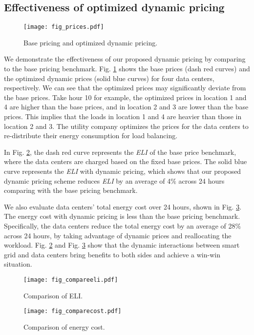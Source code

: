 \documentclass[journal]{IEEEtran}
\begin{document}
	\subsection{Effectiveness of optimized dynamic pricing}
	\begin{figure}[tbhp]
		\vspace{-2mm}
		\centering
		\texttt{[image: fig\_prices.pdf]}
		\caption{\label{fig_prices}Base pricing and optimized dynamic pricing.}
		\vspace{-2mm}
	\end{figure}
	We demonstrate the effectiveness of our proposed dynamic pricing by comparing to the base pricing benchmark. Fig. \ref{fig_prices} shows the base prices (dash red curves) and the optimized dynamic prices (solid blue curves) for four data centers, respectively. We can see that the optimized prices may significantly deviate from the base prices. Take hour 10 for example, the optimized prices in location 1 and 4 are higher than the base prices, and in location 2 and 3 are lower than the base prices. This implies that the loads in location 1 and 4 are heavier than those in location 2 and 3. The utility company optimizes the prices for the data centers to re-distribute their energy consumption for load balancing.
	
	
	In Fig. \ref{fig_compareeli}, the dash red curve represents the \emph{ELI} of the base price benchmark, where the data centers are charged based on the fixed base prices. The solid blue curve represents the \emph{ELI} with dynamic pricing, which shows that our proposed dynamic pricing scheme reduces \emph{ELI} by an average of 4$\%$ across 24 hours comparing with the base pricing benchmark.
	
	We also evaluate data centers' total energy cost over 24 hours, shown in Fig. \ref{fig_comparecost}. The energy cost with dynamic pricing is less than the base pricing benchmark. Specifically, the data centers reduce the total energy cost by an average of 28$\%$ across 24 hours, by taking advantage of dynamic prices and reallocating the workload. Fig. \ref{fig_compareeli} and Fig. \ref{fig_comparecost} show that the dynamic interactions between smart grid and data centers bring benefits to both sides and achieve a win-win situation.
	\begin{figure}[tbhp]
		\vspace{-2mm}
		\centering
		\texttt{[image: fig\_compareeli.pdf]}
		\caption{\label{fig_compareeli}Comparison of ELI.}
		\vspace{-4mm}
	\end{figure}
	\begin{figure}[tbhp]
		\vspace{-2mm}
		\centering
		\texttt{[image: fig\_comparecost.pdf]}
		\caption{\label{fig_comparecost}Comparison of energy cost.}
		\vspace{-4mm}
	\end{figure}
	
\end{document}
